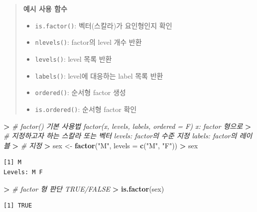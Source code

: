 \documentclass[11pt,a4paper]{book}
\newenvironment{Shaded}{\begin{snugshade}}{\end{snugshade}}
\newcommand{\KeywordTok}[1]{\textcolor[rgb]{0.13,0.29,0.53}{\textbf{#1}}}
\newcommand{\DataTypeTok}[1]{\textcolor[rgb]{0.13,0.29,0.53}{#1}}
\newcommand{\StringTok}[1]{\textcolor[rgb]{0.31,0.60,0.02}{#1}}
\newcommand{\CommentTok}[1]{\textcolor[rgb]{0.56,0.35,0.01}{\textit{#1}}}
\newcommand{\OperatorTok}[1]{\textcolor[rgb]{0.81,0.36,0.00}{\textbf{#1}}}
\newcommand{\ErrorTok}[1]{\textcolor[rgb]{0.64,0.00,0.00}{\textbf{#1}}}
\newcommand{\NormalTok}[1]{#1}
\theoremstyle{definition}
\theoremstyle{definition}
\theoremstyle{definition}
\theoremstyle{remark}
\begin{document}
\begin{quote}
\colorbox{gray!10}{\begin{minipage}{15cm}
\textbf{예시 사용 함수}
\begin{itemize}
  \item \texttt{is.factor()}: 벡터(스칼라)가 요인형인지 확인
  \item \texttt{nlevels()}: factor의 level 개수 반환
  \item \texttt{levels()}: level 목록 반환
  \item \texttt{labels()}: level에 대응하는 label 목록 반환
  \item \texttt{ordered()}: 순서형 factor 생성
  \item \texttt{is.ordered()}: 순서형 factor 확인
\end{itemize}
\end{minipage}}
\end{quote}

\vspace{0.5cm}

\footnotesize

\begin{Shaded}
\begin{Highlighting}[]
\OperatorTok{>}\StringTok{ }\CommentTok{# factor() 기본 사용법 factor(x, levels, labels, ordered = F) x: factor 형으로}
\ErrorTok{>}\StringTok{ }\CommentTok{# 지정하고자 하는 스칼라 또는 벡터 levels: factor의 수준 지정 labels: factor의 레이블}
\ErrorTok{>}\StringTok{ }\CommentTok{# 지정}
\ErrorTok{>}\StringTok{ }\NormalTok{sex <-}\StringTok{ }\KeywordTok{factor}\NormalTok{(}\StringTok{"M"}\NormalTok{, }\DataTypeTok{levels =} \KeywordTok{c}\NormalTok{(}\StringTok{"M"}\NormalTok{, }\StringTok{"F"}\NormalTok{))}
\OperatorTok{>}\StringTok{ }\NormalTok{sex}
\end{Highlighting}
\end{Shaded}

\begin{verbatim}
[1] M
Levels: M F
\end{verbatim}

\begin{Shaded}
\begin{Highlighting}[]
\OperatorTok{>}\StringTok{ }\CommentTok{# factor 형 판단 TRUE/FALSE}
\ErrorTok{>}\StringTok{ }\KeywordTok{is.factor}\NormalTok{(sex)}
\end{Highlighting}
\end{Shaded}

\begin{verbatim}
[1] TRUE
\end{verbatim}
\end{document}
